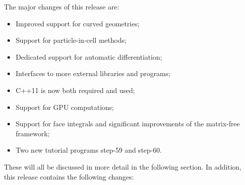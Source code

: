 \documentclass{ansarticle-preprint}
\begin{document}
The major changes of this release are:
\begin{itemize}
\item Improved support for curved geometries;
\item Support for particle-in-cell methods;
\item Dedicated support for automatic differentiation;
\item Interfaces to more external libraries and programs;
\item C++11 is now both required and used;
\item Support for GPU computations;
\item Support for face integrals and significant improvements of the matrix-free framework;
\item Two new tutorial programs step-59 and step-60.
\end{itemize}
These will all be discussed in more detail in the
following section. In addition, this release contains the following changes:
\end{document}
